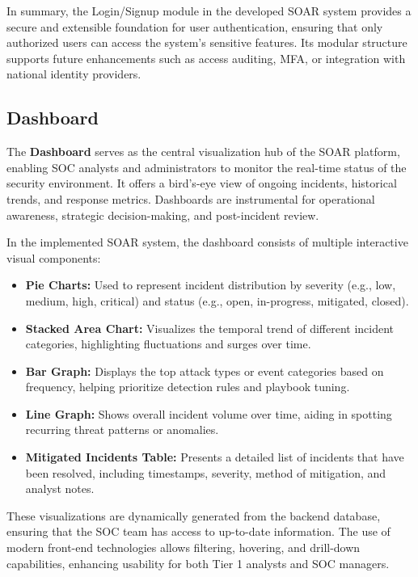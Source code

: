 In summary, the Login/Signup module in the developed SOAR system provides a secure and extensible foundation for user authentication, ensuring that only authorized users can access the system's sensitive features. Its modular structure supports future enhancements such as access auditing, MFA, or integration with national identity providers.

\subsection{Dashboard}

The \textbf{Dashboard} serves as the central visualization hub of the SOAR platform, enabling SOC analysts and administrators to monitor the real-time status of the security environment. It offers a bird’s-eye view of ongoing incidents, historical trends, and response metrics. Dashboards are instrumental for operational awareness, strategic decision-making, and post-incident review.

In the implemented SOAR system, the dashboard consists of multiple interactive visual components:

\begin{itemize}
    \item \textbf{Pie Charts:} Used to represent incident distribution by severity (e.g., low, medium, high, critical) and status (e.g., open, in-progress, mitigated, closed).
    \item \textbf{Stacked Area Chart:} Visualizes the temporal trend of different incident categories, highlighting fluctuations and surges over time.
    \item \textbf{Bar Graph:} Displays the top attack types or event categories based on frequency, helping prioritize detection rules and playbook tuning.
    \item \textbf{Line Graph:} Shows overall incident volume over time, aiding in spotting recurring threat patterns or anomalies.
    \item \textbf{Mitigated Incidents Table:} Presents a detailed list of incidents that have been resolved, including timestamps, severity, method of mitigation, and analyst notes.
\end{itemize}

These visualizations are dynamically generated from the backend database, ensuring that the SOC team has access to up-to-date information. The use of modern front-end technologies allows filtering, hovering, and drill-down capabilities, enhancing usability for both Tier 1 analysts and SOC managers.

